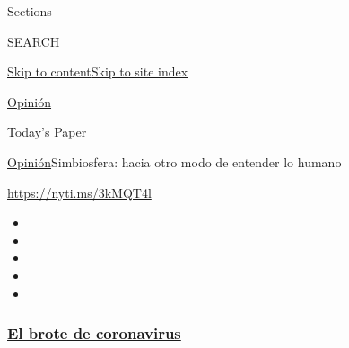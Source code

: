 Sections

SEARCH

\protect\hyperlink{site-content}{Skip to
content}\protect\hyperlink{site-index}{Skip to site index}

\href{https://www.nytimes3xbfgragh.onion/es/section/opinion}{Opinión}

\href{https://myaccount.nytimes3xbfgragh.onion/auth/login?response_type=cookie\&client_id=vi}{}

\href{https://www.nytimes3xbfgragh.onion/section/todayspaper}{Today's
Paper}

\href{/es/section/opinion}{Opinión}\textbar{}Simbiosfera: hacia otro
modo de entender lo humano

\url{https://nyti.ms/3kMQT4l}

\begin{itemize}
\item
\item
\item
\item
\item
\end{itemize}

\hypertarget{el-brote-de-coronavirus}{%
\subsubsection{\texorpdfstring{\href{https://www.nytimes3xbfgragh.onion/es/spotlight/coronavirus?name=styln-coronavirus-es\&region=TOP_BANNER\&variant=undefined\&block=storyline_menu_recirc\&action=click\&pgtype=Article\&impression_id=0b13a210-e3a0-11ea-945d-0babcf13dc84}{El
brote de
coronavirus}}{El brote de coronavirus}}\label{el-brote-de-coronavirus}}

